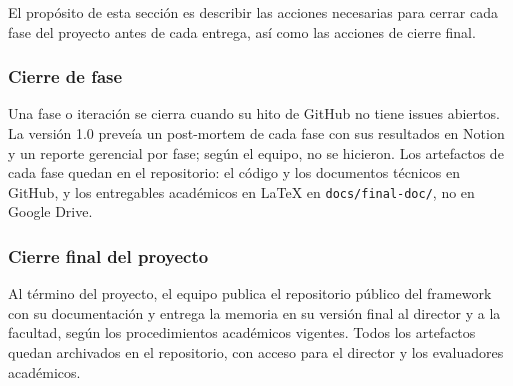 El propósito de esta sección es describir las acciones necesarias para cerrar cada fase del proyecto antes de cada entrega, así como las acciones de cierre final.

\subsubsection{Cierre de fase}

Una fase o iteración se cierra cuando su hito de GitHub no tiene issues abiertos. La versión 1.0 preveía un post-mortem de cada fase con sus resultados en Notion y un reporte gerencial por fase; según el equipo, no se hicieron. Los artefactos de cada fase quedan en el repositorio: el código y los documentos técnicos en GitHub, y los entregables académicos en LaTeX en \texttt{docs/final-doc/}, no en Google Drive.

\subsubsection{Cierre final del proyecto}

Al término del proyecto, el equipo publica el repositorio público del framework con su documentación y entrega la memoria en su versión final al director y a la facultad, según los procedimientos académicos vigentes. Todos los artefactos quedan archivados en el repositorio, con acceso para el director y los evaluadores académicos.

